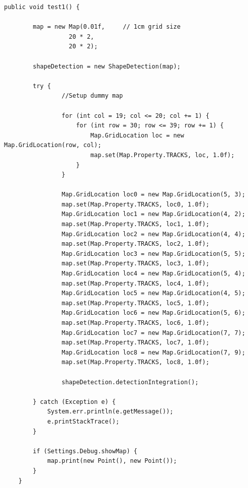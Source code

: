 \documentclass[12pt,a4paper]{article}
\begin{document}
    \begin{lstlisting}[caption=ShapeDetection automated test suite, captionpos=b, label={lst:ShapeDetectionAutomatedTestSuite}]
    public void test1() {
		
		map = new Map(0.01f,     // 1cm grid size
		   		  20 * 2,    
		   		  20 * 2);
		
		shapeDetection = new ShapeDetection(map);
		
		try {	
				//Setup dummy map
				
				for (int col = 19; col <= 20; col += 1) {
					for (int row = 30; row <= 39; row += 1) {
						Map.GridLocation loc = new Map.GridLocation(row, col);
						map.set(Map.Property.TRACKS, loc, 1.0f);
					}
				}
				
				Map.GridLocation loc0 = new Map.GridLocation(5, 3);
				map.set(Map.Property.TRACKS, loc0, 1.0f);
				Map.GridLocation loc1 = new Map.GridLocation(4, 2);
				map.set(Map.Property.TRACKS, loc1, 1.0f);
				Map.GridLocation loc2 = new Map.GridLocation(4, 4);
				map.set(Map.Property.TRACKS, loc2, 1.0f);
				Map.GridLocation loc3 = new Map.GridLocation(5, 5);
				map.set(Map.Property.TRACKS, loc3, 1.0f);
				Map.GridLocation loc4 = new Map.GridLocation(5, 4);
				map.set(Map.Property.TRACKS, loc4, 1.0f);
				Map.GridLocation loc5 = new Map.GridLocation(4, 5);
				map.set(Map.Property.TRACKS, loc5, 1.0f);
				Map.GridLocation loc6 = new Map.GridLocation(5, 6);
				map.set(Map.Property.TRACKS, loc6, 1.0f);			
				Map.GridLocation loc7 = new Map.GridLocation(7, 7);
				map.set(Map.Property.TRACKS, loc7, 1.0f);
				Map.GridLocation loc8 = new Map.GridLocation(7, 9);
				map.set(Map.Property.TRACKS, loc8, 1.0f);
				
				shapeDetection.detectionIntegration();
			
		} catch (Exception e) {
			System.err.println(e.getMessage());
			e.printStackTrace();
		}
		
		if (Settings.Debug.showMap) {
			map.print(new Point(), new Point());
		}
	}
    \end{lstlisting}
	
\end{document}
